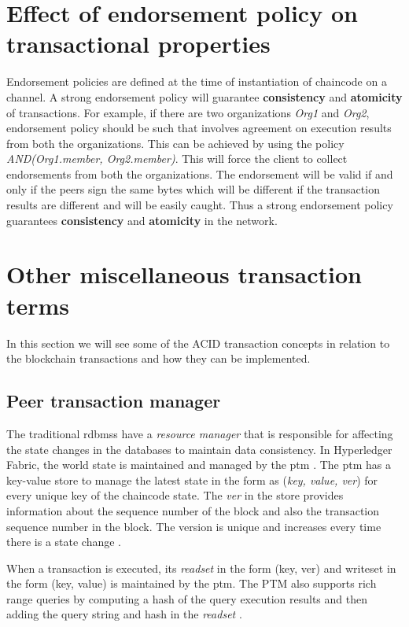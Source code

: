 \documentclass[
  a4paper,  %
  twoside,  %
  bibliography=totoc,
  headsepline,
  cleardoublepage=empty,
  parskip=half,
  draft=false
]{scrbook}
\begin{document}
\section{Effect of endorsement policy on transactional properties}
Endorsement policies are defined at the time of instantiation of chaincode on a channel. A strong endorsement policy will guarantee \textbf{consistency} and \textbf{atomicity} of transactions. For example, if there are two organizations \textit{Org1} and \textit{Org2}, endorsement policy should be such that involves agreement on execution results from both the organizations. This can be achieved by using the policy \textit{AND(Org1.member, Org2.member)}. This will force the client to collect endorsements from both the organizations. The endorsement will be valid if and only if the peers sign the same bytes which will be different if the transaction results are different and will be easily caught. Thus a strong endorsement policy guarantees \textbf{consistency} and \textbf{atomicity} in the network.

\section{Other miscellaneous transaction terms}
In this section we will see some of the ACID transaction concepts in relation to the blockchain transactions and how they can be implemented.

\subsection{Peer transaction manager}
The traditional \glspl{rdbms} have a \textit{resource manager} that is responsible for affecting the state changes in the databases to maintain data consistency. In Hyperledger Fabric, the world state is maintained and managed by the \gls{ptm} \cite{HF}. The \gls{ptm} has a key-value store to manage the latest state in the form as (\textit{key, value, ver}) for every unique key of the chaincode state. The \textit{ver} in the store provides information about the sequence number of the block and also the transaction sequence number in the block. The version is unique and increases every time there is a state change \cite{HF}.

When a transaction is executed, its \textit{readset} in the form (key, ver) and writeset in the form (key, value) is maintained by the \gls{ptm}. The PTM also supports rich range queries by computing a hash of the query execution results and then adding the query string and hash in the \textit{readset} \cite{HF}.
\end{document}
